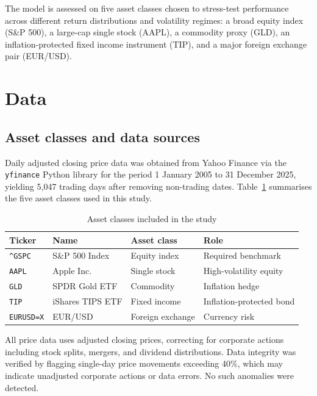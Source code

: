 \documentclass[12pt, a4paper]{article}
\begin{document}
The model is assessed on five asset classes chosen to stress-test 
performance across different return distributions and volatility 
regimes: a broad equity index (S\&P 500), a large-cap single stock 
(AAPL), a commodity proxy (GLD), an inflation-protected fixed income 
instrument (TIP), and a major foreign exchange pair (EUR/USD).

\section{Data}

\subsection{Asset classes and data sources}

Daily adjusted closing price data was obtained from Yahoo Finance 
via the \texttt{yfinance} Python library for the period 
1 January 2005 to 31 December 2025, yielding 5,047 trading days 
after removing non-trading dates. Table~\ref{tab:assets} summarises 
the five asset classes used in this study.

\begin{table}[H]
\centering
\caption{Asset classes included in the study}
\label{tab:assets}
\begin{tabular}{llll}
\toprule
\textbf{Ticker} & \textbf{Name} & \textbf{Asset class} 
  & \textbf{Role} \\
\midrule
\texttt{\^{}GSPC}   & S\&P 500 Index      & Equity index   
  & Required benchmark \\
\texttt{AAPL}       & Apple Inc.          & Single stock   
  & High-volatility equity \\
\texttt{GLD}        & SPDR Gold ETF       & Commodity      
  & Inflation hedge \\
\texttt{TIP}        & iShares TIPS ETF    & Fixed income   
  & Inflation-protected bond \\
\texttt{EURUSD=X}   & EUR/USD             & Foreign exchange 
  & Currency risk \\
\bottomrule
\end{tabular}
\end{table}

All price data uses adjusted closing prices, correcting for 
corporate actions including stock splits, mergers, and dividend 
distributions. Data integrity was verified by flagging single-day 
price movements exceeding 40\%, which may indicate unadjusted 
corporate actions or data errors. No such anomalies were detected.
\end{document}
